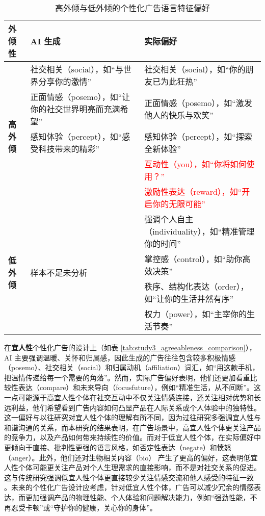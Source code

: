 \begin{table}[H]
    \centering
    \caption{\label{tab:study3_extraversion_comparison} 高外倾与低外倾的个性化广告语言特征偏好}
    {\tablesongti %
    \renewcommand{\arraystretch}{1.5} %
    \begin{tabularx}{\linewidth}{l X X} %
        \toprule
        \textbf{外倾性} & \textbf{AI 生成} & \textbf{实际偏好} \\
        \midrule
        \multirow{5}{*}{\textbf{高外倾}} 
        & 社交相关（social），如“与世界分享你的激情” & 社交相关（social），如“你的朋友已为此狂热” \\
        & 正面情感（posemo），如“让你的社交世界明亮而充满希望” & 正面情感（posemo），如“激发他人的快乐与欢笑” \\
        & 感知体验（percept），如“感受科技带来的精彩” & 感知体验（percept），如“探索全新体验” \\
        &  & \textcolor{red}{互动性（you），如“你将如何使用？”} \\
        &  & \textcolor{red}{激励性表达（reward），如“开启你的无限可能”} \\
        \midrule
        \multirow{5}{*}{\textbf{低外倾}} 
        & \multirow{5}{*}{样本不足未分析}  & 强调个人自主（individuality），如“精准管理你的时间” \\
        &  & 掌控感（control），如“助你高效决策” \\
        &  & 秩序、结构化表达（order），如“让你的生活井然有序” \\
        &  & 权力（power），如“主宰你的生活节奏” \\
        \bottomrule
    \end{tabularx}
    }
\end{table}


在\textbf{宜人性}个性化广告的设计上（如表 \ref{tab:study3_agreeableness_comparison}），AI 主要强调温暖、关怀和归属感，因此生成的广告往往包含较多积极情感（posemo）、社交相关（social）和归属动机（affiliation）词汇，如“用这款手机，把温情传递给每一个需要的角落”。然而，实际广告偏好表明，他们还更加看重比较性表达（compare）和未来导向（focusfuture），例如“精准生活，从不间断”。这一点可能源于高宜人性个体在社交互动中不仅关注情感连接，还关注相对优势和长远利益，他们希望看到广告内容如何凸显产品在人际关系或个人体验中的独特性。这一偏好与以往研究对宜人性个体的理解有所不同，因为过往研究多强调宜人性与和谐沟通的关系，而本研究的结果表明，在广告场景中，高宜人性个体更关注产品的竞争力，以及产品如何带来持续性的价值。而对于低宜人性个体，在实际偏好中更倾向于直接、批判性更强的语言风格，如否定性表达（negate）和愤怒（anger）。此外，他们还对生物相关内容（bio） 产生了更高的偏好，这表明低宜人性个体可能更关注产品对个人生理需求的直接影响，而不是对社交关系的促进。这与传统研究强调低宜人性个体更直接较少关注情感交流和他人感受的特征一致 \citep{crowe2018uncovering}。未来的个性化广告设计应考虑，针对低宜人性个体，广告可以减少冗余的情感表达，而更加强调产品的物理性能、个人体验和问题解决能力，例如“强劲性能，不再忍受卡顿”或“守护你的健康，关心你的身体”。


